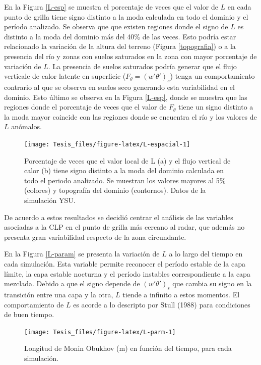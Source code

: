\documentclass[12pt,spanish,oneside, a4paper]{book}
\begin{document}
En la Figura \ref{L-esp} se muestra el porcentaje de veces que el valor
de \(L\) en cada punto de grilla tiene signo distinto a la moda
calculada en todo el dominio y el período analizado. Se observa que que
existen regiones donde el signo de \(L\) es distinto a la moda del
dominio más del 40\% de las veces. Esto podría estar relacionado la
variación de la altura del terreno (Figura \ref{topografia}) o a la
presencia del río y zonas con suelos saturados en la zona con mayor
porcentaje de variación de \(L\). La presencia de suelos saturados
podría generar que el flujo verticale de calor latente en superficie
(\(F_{\theta} = (w'\theta ')_s\)) tenga un comportamiento contrario al
que se observa en suelos seco generando esta variabilidad en el dominio.
Esto último se observa en la Figura \ref{L-esp}, donde se muestra que
las regiones donde el porcentaje de veces que el valor de \(F_{\theta}\)
tiene un signo distinto a la moda mayor coincide con las regiones donde
se encuentra el río y los valores de \(L\) anómalos.

\begin{figure}

{\centering \texttt{[image: Tesis\_files/figure-latex/L-espacial-1]} 

}

\caption{Porcentaje de veces que el valor local de L (a) y el flujo vertical de calor (b) tiene signo distinto a la moda del dominio calculada en todo el periodo analizado. Se muestran los valores mayores al 5\% (colores) y topografía del dominio (contornos). Datos de la simulación YSU. \label{L-esp}}\label{fig:L-espacial}
\end{figure}

De acuerdo a estos resultados se decidió centrar el análisis de las
variables asociadas a la CLP en el punto de grilla más cercano al radar,
que además no presenta gran variabilidad respecto de la zona
circundante.

En la Figura \ref{L-param} se presenta la variación de \(L\) a lo largo
del tiempo en cada simulación. Esta variable permite reconocer el
período estable de la capa límite, la capa estable nocturna y el período
instables correspondiente a la capa mezclada. Debido a que el signo
depende de \((w'\theta ')_s\) que cambia su signo en la transición entre
una capa y la otra, \(L\) tiende a infinito a estos momentos. El
comportamiento de \(L\) es acorde a lo descripto por Stull (1988) para
condiciones de buen tiempo.

\begin{figure}

{\centering \texttt{[image: Tesis\_files/figure-latex/L-parm-1]} 

}

\caption{Longitud de Monin Obukhov (m) en función del tiempo, para cada simulación. \label{L-param}}\label{fig:L-parm}
\end{figure}
\end{document}
